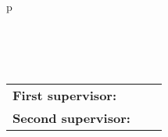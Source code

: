 \begin{center}
\begin{tabular}{p{\textwidth}}
\begin{center}
\end{center}

\\
\\
\\

\begin{center}
\begin{tabular}{lll}
\textbf{First supervisor:} & & \firstexaminer\\
\textbf{Second supervisor:} & & \secondexaminer\\
\end{tabular}
\end{center}

\end{tabular}
\end{center}
